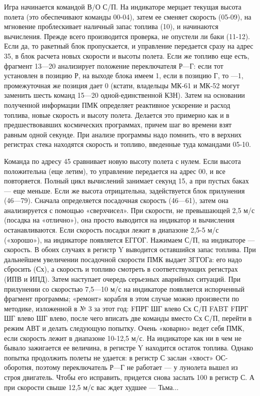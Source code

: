 \documentclass[11pt,a4paper,oneside]{article}
\begin{document}
Игра начинается командой В/О С/П. На индикаторе мерцает текущая высота полета (это обеспечивают команды 00-04), затем ее сменяет скорость (05-09), на мгновение проблескивает наличный запас топлива (10), и начинаются вычисления. Прежде всего производится проверка, не опустели ли баки (11-12). Если да, то ракетный блок пропускается, и управление передается сразу на адрес 35, в блок расчета новых скорости и высоты полета. Если же топливо еще есть, фрагмент 13—20 анализирует положение переключателя Р—Г: если тот установлен в позицию Р, на выходе блока имеем 1, если в позицию Г, то —1, промежуточная же позиция дает 0 (кстати, владельцы МК-61 и МК-52 могут заменить шесть команд 15—20 одной-единственной КЗН). Затем на основании полученной информации ПМК определяет реактивное ускорение и расход топлива, новые скорость и высоту полета. Делается это примерно как и в предшествовавших космических программах, причем шаг во времени взят равным одной секунде. При анализе программы надо помнить, что в верхних регистрах стека находятся скорость и топливо, введенные туда командами 05-10.

Команда по адресу 45 сравнивает новую высоту полета с нулем. Если высота положительна (еще летим), то управление передается на адрес 00, и все повторяется. Полный цикл вычислений занимает секунд 15, а при пустых баках — еще меньше. Если же высота отрицательна, задействуется блок прилунения (46—79). Сначала определяется посадочная скорость (46—61), затем она анализируется с помощью «сверхчисел». При скорости, не превышающей 2,5 м/с (посадка на «отлично»), она просто выводится на индикатор и вычисления останавливаются. Если скорость посадки лежит в диапазоне 2,5-5 м/с («хорошо»), на индикаторе появляется ЕГГОГ. Нажимаем С/П, на индикаторе — скорость. В обоих случаях в регистр Y выводится оставшийся запас топлива. При дальнейшем увеличении посадочной скорости ПМК выдает ЗГГОГа: его надо сбросить (Сх), а скорость и топливо смотреть в соответствующих регистрах (ИПВ и ИПД). Затем наступает очередь серьезных аварийных ситуаций. При прилунении со скоростью 7,5—10 м/с на индикаторе появляется испорченный фрагмент программы; «ремонт» корабля в этом случае можно произвести по методике, изложенной в № 3 за этот год: FПРГ ШГ влево Сх С/П FABT FПРГ ШГ влево ШГ влево, после чего вписать две команды вместо Сх С/П, перейти в режим АВТ и делать следующую попытку. Очень «коварно» ведет себя ПМК, если скорость лежит в диапазоне 10-12,5 м/с. На индикаторе как ни в чем не бывало зажигается ее величина, в регистре Y находится остаток топлива. Однако попытка продолжить полеты не удается: в регистр С заслан «хвост» ОС- оборотня, поэтому переключатель Р—Г не работает — у лунолета вышел из строя двигатель. Чтобы его исправить, придется снова заслать 100 в регистр С. А при скорости свыше 12,5 м/с вас ждет худшее — Тьма...
\end{document}
